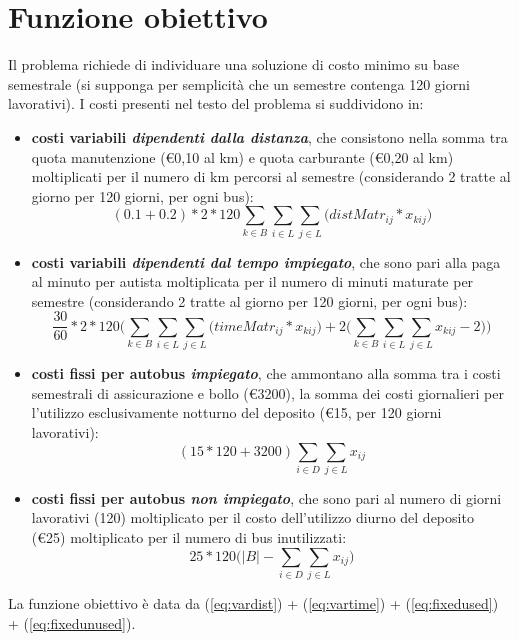 \section{Funzione obiettivo}
Il problema richiede di individuare una soluzione di costo minimo su base semestrale (si supponga per semplicità che un semestre contenga 120 giorni lavorativi). I costi presenti nel testo del problema si suddividono in:
\begin{itemize}
  \item \textbf{costi variabili \textit{dipendenti dalla distanza}}, che consistono nella somma tra quota manutenzione (€0,10 al km) e quota carburante (€0,20 al km) moltiplicati per il numero di km percorsi al semestre (considerando 2 tratte al giorno per 120 giorni, per ogni bus):
\begin{equation}
  \label{eq:vardist}
  (0.1 + 0.2) * 2 * 120\sum_{k \in B}\sum_{i \in L}\sum_{j \in L}\Big(distMatr_{ij} * x_{kij}\Big)
\end{equation}
  \item \textbf{costi variabili \textit{dipendenti dal tempo impiegato}}, che sono pari alla paga al minuto per autista moltiplicata per il numero di minuti maturate per semestre (considerando 2 tratte al giorno per 120 giorni, per ogni bus):
\begin{equation}
  \label{eq:vartime}
  \frac{30}{60} * 2 * 120\Bigg(\sum_{k \in B}\sum_{i \in L}\sum_{j \in L}\Big(timeMatr_{ij} * x_{kij}\Big) + 2\Big(\sum_{k \in B}\sum_{i \in L}\sum_{j \in L} x_{kij} -2\Big) \Bigg)
\end{equation}
\item \textbf{costi fissi per autobus \textit{impiegato}}, che ammontano alla somma tra i costi semestrali di assicurazione e bollo (€3200), la somma dei costi giornalieri per l'utilizzo esclusivamente notturno del deposito (€15, per 120 giorni lavorativi):
\begin{equation}
  \label{eq:fixedused}
  (15 * 120 + 3200) \sum_{i \in D}\sum_{j \in L} x_{ij}
\end{equation}
\item \textbf{costi fissi per autobus \textit{non impiegato}}, che sono pari al numero di giorni lavorativi (120) moltiplicato per il costo dell'utilizzo diurno del deposito (€25) moltiplicato per il numero di bus inutilizzati:
\begin{equation}
  \label{eq:fixedunused}
    25 * 120 \Big(|B| - \sum_{i \in D}\sum_{j \in L} x_{ij}\Big)
  \end{equation}
\end{itemize}
La funzione obiettivo è data da (\ref{eq:vardist}) + (\ref{eq:vartime}) + (\ref{eq:fixedused}) + (\ref{eq:fixedunused}).



